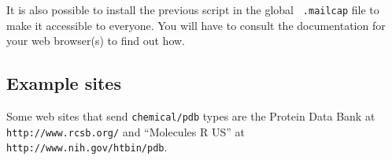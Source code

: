 It is also possible to install the previous script in the global {\tt
.mailcap} file to make it accessible to everyone.  You will have to
consult the documentation for your web browser(s) to find out how.

\subsection{Example sites}

Some web sites that send {\tt chemical/pdb} types are the
Protein Data Bank at {\tt http://www.rcsb.org/} and ``Molecules R
US'' at {\tt http://www.nih.gov/htbin/pdb}.

